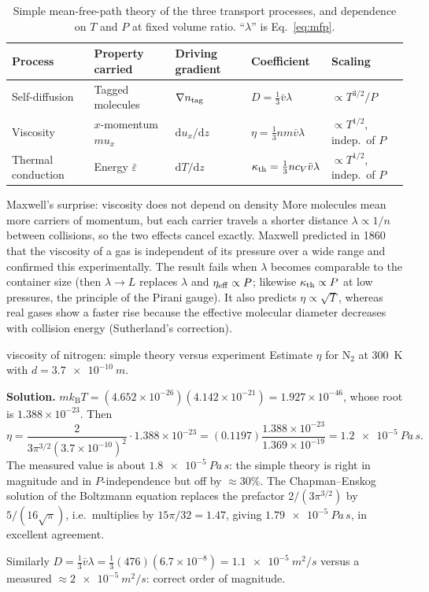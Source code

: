 \documentclass[11pt,a4paper]{report}
\theoremstyle{definition}
\theoremstyle{plain}
\newcommand{\kB}{k_{\mathrm{B}}}
\newcommand{\dd}{\mathrm{d}}
\newcommand{\vbar}{\bar{v}}
\begin{document}
\begin{table}[h]
\centering
\caption{Simple mean-free-path theory of the three transport processes, and dependence on $T$ and $P$ at fixed volume ratio. ``$\lambda$'' is Eq.~\eqref{eq:mfp}.}
\label{tab:transport}
\begin{tabular}{@{}lllll@{}}
\toprule
Process & Property carried & Driving gradient & Coefficient & Scaling\\
\midrule
Self-diffusion & Tagged molecules & $\nabla n_{\rm tag}$ & $D=\tfrac13\vbar\lambda$ & $\propto T^{3/2}/P$\\
Viscosity & $x$-momentum $mu_x$ & $\dd u_x/\dd z$ & $\eta=\tfrac13nm\vbar\lambda$ & $\propto T^{1/2}$, indep.\ of $P$\\
Thermal conduction & Energy $\bar\varepsilon$ & $\dd T/\dd z$ & $\kappa_{\rm th}=\tfrac13nc_V\vbar\lambda$ & $\propto T^{1/2}$, indep.\ of $P$\\
\bottomrule
\end{tabular}
\end{table}

\begin{keyidea}{Maxwell's surprise: viscosity does not depend on density}
More molecules mean more carriers of momentum, but each carrier travels a shorter distance $\lambda\propto1/n$ between collisions, so the two effects cancel exactly. Maxwell predicted in 1860 that the viscosity of a gas is independent of its pressure over a wide range and confirmed this experimentally. The result fails when $\lambda$ becomes comparable to the container size (then $\lambda\to L$ replaces $\lambda$ and $\eta_{\rm eff}\propto P$; likewise $\kappa_{\rm th}\propto P$ at low pressures, the principle of the Pirani gauge). It also predicts $\eta\propto\sqrt T$, whereas real gases show a faster rise because the effective molecular diameter decreases with collision energy (Sutherland's correction).
\end{keyidea}

\begin{workedex}{viscosity of nitrogen: simple theory versus experiment}
Estimate $\eta$ for N$_2$ at \SI{300}{K} with $d=\SI{3.7e-10}{m}$.

\medskip\noindent\textbf{Solution.} $m\kB T=(4.652\times10^{-26})(4.142\times10^{-21})=1.927\times10^{-46}$, whose root is $1.388\times10^{-23}$. Then
\[
\eta=\frac{2}{3\pi^{3/2}(3.7\times10^{-10})^2}\cdot1.388\times10^{-23}=(0.1197)\frac{1.388\times10^{-23}}{1.369\times10^{-19}}=\SI{1.2e-5}{Pa\,s}.
\]
The measured value is about $\SI{1.8e-5}{Pa\,s}$: the simple theory is right in magnitude and in $P$-independence but off by $\approx30\%$. The Chapman--Enskog solution of the Boltzmann equation replaces the prefactor $2/(3\pi^{3/2})$ by $5/(16\sqrt\pi)$, i.e.\ multiplies by $15\pi/32=1.47$, giving $\SI{1.79e-5}{Pa\,s}$, in excellent agreement.

\medskip\noindent Similarly $D=\tfrac13\vbar\lambda=\tfrac13(476)(6.7\times10^{-8})=\SI{1.1e-5}{m^2/s}$ versus a measured $\approx\SI{2e-5}{m^2/s}$: correct order of magnitude.
\end{workedex}
\end{document}
